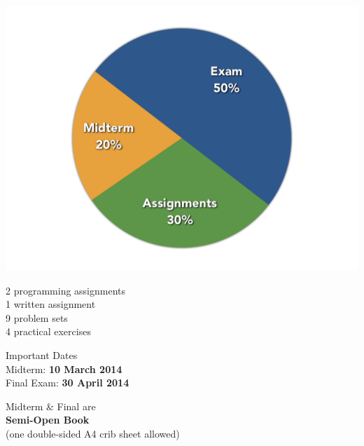 \begin{frame}
\begin{center}
	\includegraphics[scale=0.3]{figures/assessment-chart.png}
\end{center}
\end{frame}

\begin{frame}
\begin{center}
\large
2 programming assignments\\
1 written assignment\\
9 problem sets\\
4 practical exercises\\
\end{center}
\end{frame}

\begin{frame}
\begin{center}
\large
Important Dates\\
Midterm: \textbf{10 March 2014}\\
Final Exam: \textbf{30 April 2014}
\end{center}
\end{frame}

\begin{frame}
\begin{center}
\large
Midterm \& Final are\\
\large
\textbf{Semi-Open Book}\\
\normalsize
(one double-sided A4 crib sheet allowed)
\end{center}
\end{frame}

